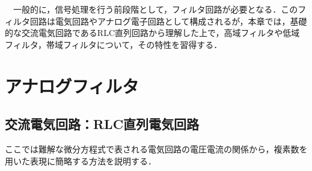 
\begin{lead}
　一般的に，信号処理を行う前段階として，フィルタ回路が必要となる．このフィルタ回路は電気回路やアナログ電子回路として構成されるが，本章では，基礎的な交流電気回路であるRLC直列回路から理解した上で，高域フィルタや低域フィルタ，帯域フィルタについて，その特性を習得する．

\end{lead}




\chapter{アナログフィルタ}
\label{chapter:a-filter}

\section{交流電気回路：RLC直列電気回路}

ここでは難解な微分方程式で表される電気回路の電圧電流の関係から，複素数を用いた表現に簡略する方法を説明する．

